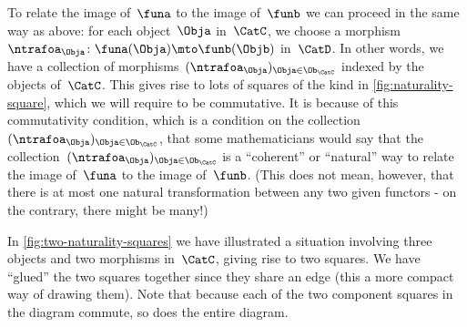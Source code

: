 To relate the image of~$\funa$ to the image of~$\funb$ we can proceed in the same way as above: for each object~$\Obja$ in~$\CatC$, we choose a morphism~$\ntrafoa_\Obja \colon \funa(\Obja) \mto \funb(\Objb)$ in~$\CatD$.
In other words, we have a collection of morphisms~$(\ntrafoa_\Obja)_{\Obja \in \Ob_\CatC}$ indexed by the objects of~$\CatC$.
This gives rise to lots of squares of the kind in \cref{fig:naturality-square}, which we will require to be commutative.
It is because of this commutativity condition, which is a condition on the collection~$(\ntrafoa_\Obja)_{\Obja \in \Ob_\CatC}$, that some mathematicians would say that the collection~$(\ntrafoa_\Obja)_{\Obja \in \Ob_\CatC}$ is a ``coherent'' or ``natural'' way to relate the image of~$\funa$ to the image of~$\funb$.
(This does not mean, however, that there is at most one natural transformation between any two given functors - on the contrary, there might be many!)

In \cref{fig:two-naturality-squares} we have illustrated a situation involving three objects and two morphisms in~$\CatC$, giving rise to two squares.
We have ``glued'' the two squares together since they share an edge (this a more compact way of drawing them).
Note that because each of the two component squares in the diagram commute, so does the entire diagram.

%
\begin{marginfigure}
    \centering
    \caption{}
    \label{fig:two-naturality-squares}
\end{marginfigure}
%

\


